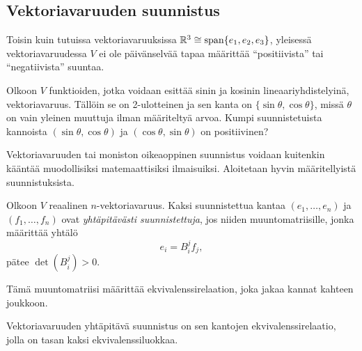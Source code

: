 \subsection{Vektoriavaruuden suunnistus}
Toisin kuin tutuissa vektoriavaruuksissa $\mathbb{R}^3\cong\text{span}\{e_1,e_2,e_3\}$, yleisessä vektoriavaruudessa $V$ ei ole päivänselvää tapaa määrittää ``positiivista'' tai ``negatiivista'' suuntaa.
\begin{esimerkki}
    Olkoon $V$ funktioiden, jotka voidaan esittää sinin ja kosinin lineaariyhdistelyinä, vektoriavaruus. Tällöin se on 2-ulotteinen ja sen kanta on $\{\sin\theta,\cos\theta\}$, missä $\theta$ on vain yleinen muuttuja ilman määriteltyä arvoa. Kumpi suunnistetuista kannoista $(\sin\theta,\cos\theta)$ ja $(\cos\theta,\sin\theta)$ on positiivinen?
\end{esimerkki}
Vektoriavaruuden tai moniston oikeaoppinen suunnistus voidaan kuitenkin kääntää muodollisiksi matemaattisiksi ilmaisuiksi. Aloitetaan hyvin määritellyistä suunnistuksista.
\begin{maaritelma}
    Olkoon $V$ reaalinen $n$-vektoriavaruus. Kaksi suunnistettua kantaa $(e_1,\dots,e_n)$ ja $(f_1,\dots,f_n)$ ovat \emph{yhtäpitävästi suunnistettuja}, jos niiden muuntomatriisille, jonka määrittää yhtälö
    \begin{equation*}
        e_i=B_i^j f_j,
    \end{equation*}
    pätee $\det(B_i^j)>0$.
\end{maaritelma}
Tämä muuntomatriisi määrittää ekvivalenssirelaation, joka jakaa kannat kahteen joukkoon. 
\begin{lemma}
    Vektoriavaruuden yhtäpitävä suunnistus on sen kantojen ekvivalenssirelaatio, jolla on tasan kaksi ekvivalenssiluokkaa.
\end{lemma}
